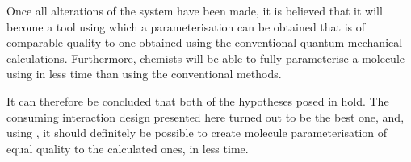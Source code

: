 Once all alterations of the system have been made, it is believed that it will become a tool using which a parameterisation can be obtained that is of comparable quality to one obtained using the conventional quantum-mechanical calculations. Furthermore, chemists will be able to fully parameterise a molecule using \oframp{} in less time than using the conventional methods.

It can therefore be concluded that both of the hypotheses posed in  hold. The consuming interaction design presented here turned out to be the best one, and, using \oframp, it should definitely be possible to create molecule parameterisation of equal quality to the calculated ones, in less time.
